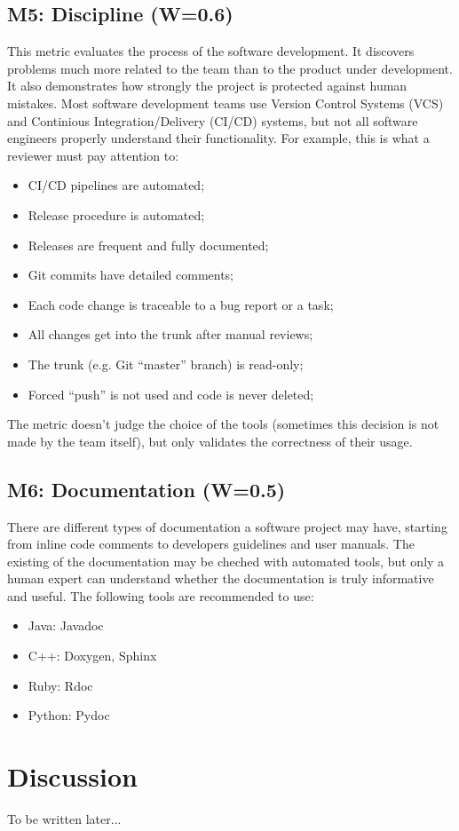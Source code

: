\documentclass[12pt,oneside]{article}
\begin{document}
\subsection{M5: Discipline (W=0.6)}

This metric evaluates the process of the software
development. It discovers problems much more related to the team than
to the product under development. It also demonstrates how strongly the project is
protected against human mistakes. Most software development teams use
Version Control Systems (VCS) and Continious Integration/Delivery (CI/CD) systems, but not all
software engineers properly understand their functionality. For example, this is what
a reviewer must pay attention to:

\begin{itemize}
  \item CI/CD pipelines are automated;
  \item Release procedure is automated;
  \item Releases are frequent and fully documented;
  \item Git commits have detailed comments;
  \item Each code change is traceable to a bug report or a task;
  \item All changes get into the trunk after manual reviews;
  \item The trunk (e.g. Git ``master'' branch) is read-only;
  \item Forced ``push'' is not used and code is never deleted;
\end{itemize}

The metric doesn't judge the choice of the tools (sometimes this decision
is not made by the team itself), but only validates the correctness
of their usage.

\subsection{M6: Documentation (W=0.5)}

There are different types of documentation a software project may have,
starting from inline code comments to developers guidelines and user manuals.
The existing of the documentation may be cheched with automated tools,
but only a human expert can understand whether the documentation is truly
informative and useful. The following tools are recommended to use:

\begin{itemize}
  \item Java: Javadoc
  \item C++: Doxygen, Sphinx
  \item Ruby: Rdoc
  \item Python: Pydoc
\end{itemize}

\section{Discussion}
\label{sec:discussion}

To be written later...

\raggedright

\end{document}
